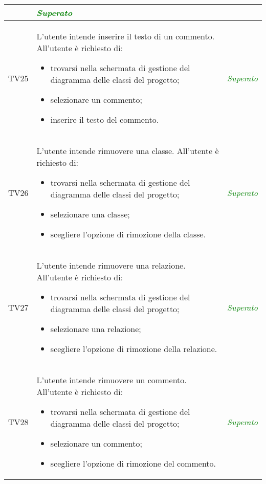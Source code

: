 \begin{longtable}{|c|>{}m{8cm}|c|}
\begin{itemize}
\end{itemize} & \textcolor{Green}{\textit{Superato}}\\ \hline
\hypertarget{TV3.3.1}{TV25} & L'utente intende inserire il testo di un commento. 
All'utente è richiesto di: 
\begin{itemize} 
	\item trovarsi nella schermata di gestione del diagramma delle classi del progetto;
	\item selezionare un commento;
	\item inserire il testo del commento.
\end{itemize} & \textcolor{Green}{\textit{Superato}}\\ \hline

\hypertarget{TV3.4}{TV26} & L'utente intende rimuovere una classe.
All'utente è richiesto di:
\begin{itemize}
	\item trovarsi nella schermata di gestione del diagramma delle classi del progetto;
	\item selezionare una classe;
	\item scegliere l'opzione di rimozione della classe.
\end{itemize} & \textcolor{Green}{\textit{Superato}}\\ \hline

\hypertarget{TV3.5}{TV27} & L'utente intende rimuovere una relazione.
All'utente è richiesto di:
\begin{itemize}
	\item trovarsi nella schermata di gestione del diagramma delle classi del progetto;
	\item selezionare una relazione; 
	\item scegliere l'opzione di rimozione della relazione.
\end{itemize} & \textcolor{Green}{\textit{Superato}}\\ \hline

\hypertarget{TV3.6}{TV28} & L'utente intende rimuovere un commento.
All'utente è richiesto di:
\begin{itemize}
	\item trovarsi nella schermata di gestione del diagramma delle classi del progetto;
	\item selezionare un commento;
	\item scegliere l'opzione di rimozione del commento.
\end{itemize} & \textcolor{Green}{\textit{Superato}}\\ \hline


\end{longtable}
